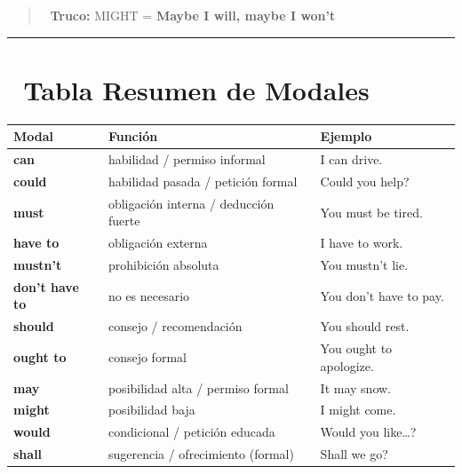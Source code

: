 \documentclass[
  spanish,
  letterpaper,
]{scrbook}
\begin{document}
\begin{quote}
🧠 \textbf{Truco:} MIGHT = \textbf{Maybe I will, maybe I won't}
\end{quote}

\begin{center}\rule{0.5\linewidth}{0.5pt}\end{center}

\section{📐 Tabla Resumen de Modales}\label{tabla-resumen-de-modales}

\begin{longtable}[]{@{}
  >{\raggedright\arraybackslash}p{}
  >{\raggedright\arraybackslash}p{}
  >{\raggedright\arraybackslash}p{}@{}}
\toprule\noalign{}
\begin{minipage}[b]{\linewidth}\raggedright
Modal
\end{minipage} & \begin{minipage}[b]{\linewidth}\raggedright
Función
\end{minipage} & \begin{minipage}[b]{\linewidth}\raggedright
Ejemplo
\end{minipage} \\
\midrule\noalign{}
\endhead
\bottomrule\noalign{}
\endlastfoot
\textbf{can} & habilidad / permiso informal & I can drive. \\
\textbf{could} & habilidad pasada / petición formal & Could you help? \\
\textbf{must} & obligación interna / deducción fuerte & You must be
tired. \\
\textbf{have to} & obligación externa & I have to work. \\
\textbf{mustn't} & prohibición absoluta & You mustn't lie. \\
\textbf{don't have to} & no es necesario & You don't have to pay. \\
\textbf{should} & consejo / recomendación & You should rest. \\
\textbf{ought to} & consejo formal & You ought to apologize. \\
\textbf{may} & posibilidad alta / permiso formal & It may snow. \\
\textbf{might} & posibilidad baja & I might come. \\
\textbf{would} & condicional / petición educada & Would you
like\ldots? \\
\textbf{shall} & sugerencia / ofrecimiento (formal) & Shall we go? \\
\end{longtable}
\end{document}
